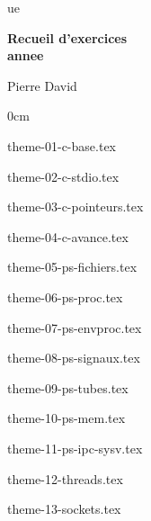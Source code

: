 \documentclass [twoside] {report}
\newcommand {\tassertoc} {{ \setlength {\parskip} {0cm} \tableofcontents }}
\newcommand {\marquerchapitre} [1]
    {
        \addcontentsline {toc} {chapter} {#1}
        \markboth {#1} {#1}
    }
\newcommand {\chapitresanstitre} [1]
    {
        \cleardoublepage
	\marquerchapitre {#1}
    }
\newcommand {\titrechapitre} [1]
    {
	\begin {center}
	    \Large \bf #1
	\end {center}
	\bigskip
	\bigskip
    }
\newcommand {\chapitre} [1]
    {
        \chapitresanstitre {#1}
        \titrechapitre {#1}
    }
\newcounter {td}
\newcounter {tp}
\newcounter {exercice} [tp]
\begin{document}
\thispagestyle {empty}

\begin {titlepage}
     {ue}

    \vfill

    \begin {center}
	\huge\bf
	Recueil d'exercices \\
	\vspace* {5mm}
	 {annee}
    \end {center}

    \vfill

    \begin {flushright}
	Pierre David
    \end {flushright}
\end {titlepage}

\cleardoublepage
\tassertoc


% 
% 
% 
% 
% 
% 
% 


 {theme-01-c-base.tex}

 {theme-02-c-stdio.tex}

 {theme-03-c-pointeurs.tex}

 {theme-04-c-avance.tex}

 {theme-05-ps-fichiers.tex}

 {theme-06-ps-proc.tex}

 {theme-07-ps-envproc.tex}

 {theme-08-ps-signaux.tex}

 {theme-09-ps-tubes.tex}

 {theme-10-ps-mem.tex}

 {theme-11-ps-ipc-sysv.tex}

 {theme-12-threads.tex}

 {theme-13-sockets.tex}
\end{document}
